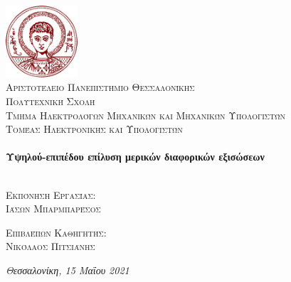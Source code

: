 \thispagestyle{empty}
\begin{center}

\includegraphics[width=0.2\textwidth]{figures/ap8.jpeg}~\\[1cm]

\textsc{\LARGE Αριστοτέλειο Πανεπιστήμιο Θεσσαλονίκης}\\[1cm]
\textsc{ Πολυτεχνική Σχολή}\\
\textsc{ Τμήμα Ηλεκτρολόγων Μηχανικών και Μηχανικών Υπολογιστών}\\
\textsc{Τομέας Ηλεκτρονικής και Υπολογιστών}\\[1.5cm]

\HRule \\[0.4cm]
{ \huge \bfseries Υψηλού-επιπέδου επίλυση μερικών διαφορικών εξισώσεων\\[0.4cm] }
\HRule \\[2.5cm]

\begin{minipage}[t]{0.48\textwidth}
\textsc{Εκπόνηση Εργασίας:}\\[0.3cm]
\textsc{\Large Ιάσων Μπαρμπαρέσος}
\end{minipage}
\hfill
\begin{minipage}[t]{0.48\textwidth}
\begin{flushright}
\textsc{Επιβλέπων Καθηγητής:}\\[0.3cm]
\textsc{\Large Νικόλαος Πιτσιάνης}
\end{flushright}
\end{minipage}


\vfill

{\Large \textit{Θεσσαλονίκη, 15 Μαΐου 2021}}

\end{center}
\clearpage
 
